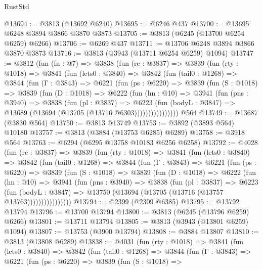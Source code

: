 \begin{lexlean}{RustStd}
\begin{coremodule}
@13694 := @3813 (@13692 @6240)
@13695 := @6246 @437
@13700 := @13695 @6248 @3894 @3866 @3870 @3873
@13705 := @3813 (@6245 (@13700 @6254 @6259) @6266)
@13706 := @6269 @437
@13711 := @13706 @6248 @3894 @3866 @3870 @3873
@13716 := @3813 (@3943 (@13711 @6254 @6259) @1094)
@13747 := @3812
    (fun (fn : @7) =>
    @3838
      (fun (rc : @3837) =>
      @3839
        (fun (rty : @1018) =>
        @3841
          (fun (lets0 : @3840) =>
          @3842
            (fun (tail0 : @1268) =>
            @3844
              (fun (Γ : @3843) =>
              @6221
                (fun (ps : @6220) =>
                @3839
                  (fun (S : @1018) =>
                  @3839
                    (fun (D : @1018) =>
                    @6222
                      (fun (hn : @10) =>
                      @3941
                        (fun (pns : @3940) =>
                        @3838
                          (fun (pl : @3837) =>
                          @6223
                            (fun (bodyL : @3847) =>
                            @13689 (@13694 (@13705 (@13716 @6303))))))))))))))))
    @564
@13749 := @13687 (@3830 @564)
@13750 := @3813 @13749
@13753 := @3892 (@3893 @564) @10180
@13757 := @3813 (@3884 (@13753 @6285) @6289)
@13758 := @3918 @564
@13763 := @6294 (@6295 @13758 @10183 @6256 @6258)
@13792 := @4028
    (fun (rc : @3837) =>
    @3839
      (fun (rty : @1018) =>
      @3841
        (fun (lets0 : @3840) =>
        @3842
          (fun (tail0 : @1268) =>
          @3844
            (fun (Γ : @3843) =>
            @6221
              (fun (ps : @6220) =>
              @3839
                (fun (S : @1018) =>
                @3839
                  (fun (D : @1018) =>
                  @6222
                    (fun (hn : @10) =>
                    @3941
                      (fun (pns : @3940) =>
                      @3838
                        (fun (pl : @3837) =>
                        @6223
                          (fun (bodyL : @3847) =>
                          @13750 (@13694 (@13705 (@13716 (@13757 @13763))))))))))))))))
@13794 := @2399 (@2309 @6385)
@13795 := @13792 @13794
@13796 := @13700 @13794
@13800 := @3813 (@6245 (@13796 @6259) @6266)
@13801 := @13711 @13794
@13805 := @3813 (@3943 (@13801 @6259) @1094)
@13807 := @13753 (@3900 @13794)
@13808 := @3884 @13807
@13810 := @3813 (@13808 @6289)
@13838 := @4031
    (fun (rty : @1018) =>
    @3841
      (fun (lets0 : @3840) =>
      @3842
        (fun (tail0 : @1268) =>
        @3844
          (fun (Γ : @3843) =>
          @6221
            (fun (ps : @6220) =>
            @3839
              (fun (S : @1018) =>

\end{coremodule}
\end{lexlean}
